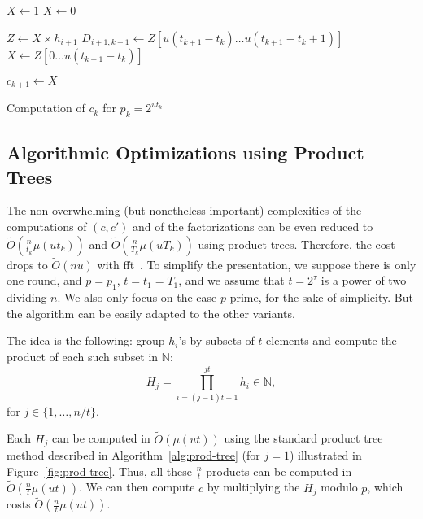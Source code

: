 \documentclass[11pt]{llncs}
\newcommand{\Oapp}{\ensuremath{\tilde{O}}}
\begin{document}
\begin{algorithm}
\newcommand{\vstart}{\ensuremath{\mathrm{start}}}
\newcommand{\vmid}{\ensuremath{\mathrm{mid}}}
\newcommand{\vend}{\ensuremath{\mathrm{end}}}
\begin{algorithmic}[1]

  \State $X \gets 1$
\Else
  \State $X \gets 0$
\EndIf

  \State $Z \gets X \times h_{i+1}$
  \State $D_{i+1,k+1} \gets Z[u(t_{k+1}-t_k)\dots u(t_{k+1}-t_k+1)]$
  \State $X \gets Z[0\dots u(t_{k+1}-t_k)]$
\EndFor

\State $c_{k+1} \gets X$
\end{algorithmic}
\caption{Computation of $c_k$ for $p_k = 2^{ut_k}$}\label{alg:even-p-c}
\end{algorithm}

\subsection{Algorithmic Optimizations using Product Trees}
\label{sec:algo-opt-prod-trees}

The non-overwhelming (but nonetheless important) complexities of the computations of $(c,c')$ and of the factorizations can be even reduced to $\Oapp(\frac{n}{t_k} \mu(u t_k))$ and $\Oapp(\frac{n}{T_k} \mu(u T_k))$ using product trees. 
Therefore, the cost drops to $\Oapp(n u)$ with {\sc fft}~\cite{schonhage1971schnelle}. 
To simplify the presentation, we suppose there is only one round, and $p=p_1$, $t=t_1=T_1$, and we assume that $t=2^\tau$ is a power of two dividing $n$.
We also only focus on the case $p$ prime, for the sake of simplicity.
But the algorithm can be easily adapted to the other variants.

The idea is the following: group $h_i$'s by subsets of $t$ elements and compute the product of each such subset in $\mathbb{N}$:
\[ H_j = \prod_{i=(j-1) t + 1}^{j t} h_i\in\mathbb{N}, \]
for $j \in \{1,\dots,n/t\}$.

Each $H_j$ can be computed in $\Oapp(\mu(u t))$ using the standard product tree method described in Algorithm~\ref{alg:prod-tree} (for $j=1$) illustrated in Figure~\ref{fig:prod-tree}.
Thus, all these $\frac{n}{t}$ products can be computed in $\Oapp(\frac{n}{t} \mu(u t))$. We can then compute $c$ by multiplying the $H_j$ modulo $p$, which costs $\Oapp(\frac{n}{t} \mu(u t))$.
\end{document}

